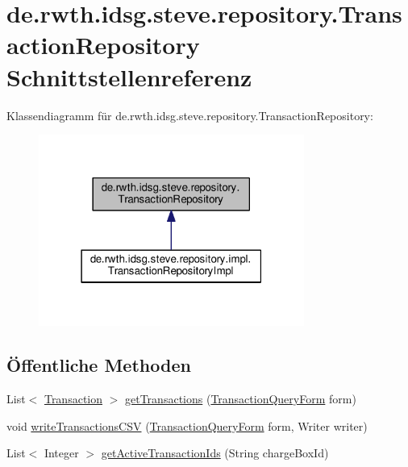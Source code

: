 \hypertarget{interfacede_1_1rwth_1_1idsg_1_1steve_1_1repository_1_1_transaction_repository}{\section{de.\+rwth.\+idsg.\+steve.\+repository.\+Transaction\+Repository Schnittstellenreferenz}
\label{interfacede_1_1rwth_1_1idsg_1_1steve_1_1repository_1_1_transaction_repository}
}


Klassendiagramm für de.\+rwth.\+idsg.\+steve.\+repository.\+Transaction\+Repository\+:\nopagebreak
\begin{figure}[H]
\begin{center}
\leavevmode
\includegraphics[width=247pt]{interfacede_1_1rwth_1_1idsg_1_1steve_1_1repository_1_1_transaction_repository__inherit__graph}
\end{center}
\end{figure}
\subsection*{Öffentliche Methoden}
\begin{DoxyCompactItemize}
\item 
List$<$ \hyperlink{classde_1_1rwth_1_1idsg_1_1steve_1_1repository_1_1dto_1_1_transaction}{Transaction} $>$ \hyperlink{interfacede_1_1rwth_1_1idsg_1_1steve_1_1repository_1_1_transaction_repository_af2ae1a05e2d5fb1de8fe20e8802da77d}{get\+Transactions} (\hyperlink{classde_1_1rwth_1_1idsg_1_1steve_1_1web_1_1dto_1_1_transaction_query_form}{Transaction\+Query\+Form} form)
\item 
void \hyperlink{interfacede_1_1rwth_1_1idsg_1_1steve_1_1repository_1_1_transaction_repository_a30ac3d2ce97caf4e5ee023de6ec9884f}{write\+Transactions\+C\+S\+V} (\hyperlink{classde_1_1rwth_1_1idsg_1_1steve_1_1web_1_1dto_1_1_transaction_query_form}{Transaction\+Query\+Form} form, Writer writer)
\item 
List$<$ Integer $>$ \hyperlink{interfacede_1_1rwth_1_1idsg_1_1steve_1_1repository_1_1_transaction_repository_af2452533bc153cc48dd5a8205ed45fd1}{get\+Active\+Transaction\+Ids} (String charge\+Box\+Id)
\end{DoxyCompactItemize}


